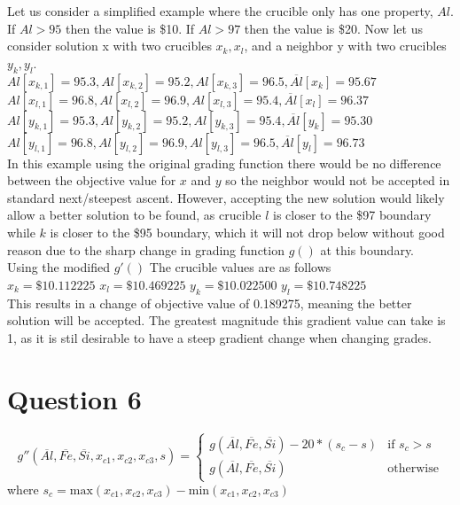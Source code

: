\documentclass{article}
\begin{document}
Let us consider a simplified example where the crucible only has one 
property, $Al$. If $Al > 95$ then the value is \$10. If $Al > 97$ then the
value is \$20. Now let us consider solution x with two crucibles 
$x_k, x_l$, and a neighbor y with two crucibles $y_k, y_l$. \\
$Al[x_{k,1}]=95.3,Al[x_{k,2}]=95.2,Al[x_{k,3}]=96.5,\overline{Al}[x_k]=95.67$\\
$Al[x_{l,1}]=96.8,Al[x_{l,2}]=96.9,Al[x_{l,3}]=95.4,\overline{Al}[x_l]=96.37$\\
$Al[y_{k,1}]=95.3,Al[y_{k,2}]=95.2,Al[y_{k,3}]=95.4,\overline{Al}[y_k]=95.30$\\
$Al[y_{l,1}]=96.8,Al[y_{l,2}]=96.9,Al[y_{l,3}]=96.5,\overline{Al}[y_l]=96.73$\\

In this example using the original grading function there would be no
difference between the objective value for $x$ and $y$ so the neighbor
would not be accepted in standard next/steepest ascent. However, 
accepting the new solution would likely allow a better solution to be 
found, as crucible $l$ is closer to the \$97 boundary while
$k$ is closer to the \$95 boundary, which it will not drop below without
good reason due to the sharp change in grading function $g()$ at this
boundary.\\

Using the modified $g'()$ The crucible values are as follows\\
$x_k = \$10.112225$ 
$x_l = \$10.469225$ 
$y_k = \$10.022500$ 
$y_l = \$10.748225$ \\
This results in a change of objective value of 0.189275, meaning the
better solution will be accepted. The greatest magnitude this gradient
value can take is 1, as it is stil desirable to have a steep gradient
change when changing grades. 

\section{Question 6}
$$g''(\overline{Al}, \overline{Fe}, \overline{Si}, x_{c1}, x_{c2}, 
x_{c3}, s) =
\begin{cases}
    g(\overline{Al}, \overline{Fe}, \overline{Si}) - 20*(s_c - s) & \text{if } s_c > s \\
    g(\overline{Al}, \overline{Fe}, \overline{Si}) & \text{otherwise}
\end{cases}$$ where
$s_c = \text{max}(x_{c1}, x_{c2}, x_{c3}) - \text{min}(x_{c1}, x_{c2}, x_{c3})$
\end{document}
